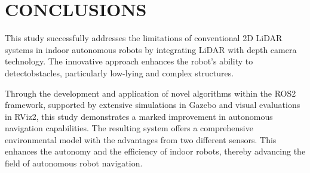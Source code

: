 \section{CONCLUSIONS}
\label{sec:conclusions}
This study successfully addresses the limitations of conventional 2D LiDAR systems in indoor autonomous robots 
by integrating LiDAR with depth camera technology. 
The innovative  approach enhances the robot's ability to detectobstacles, particularly low-lying and complex structures.

Through the development and application of novel algorithms within the ROS2 framework, 
supported by extensive simulations in Gazebo and visual evaluations in RViz2, 
this study demonstrates a marked improvement in autonomous navigation capabilities. 
The resulting system offers a comprehensive environmental model with the advantages from two different sensors. 
This enhances the autonomy and the efficiency of indoor robots, thereby advancing the field of autonomous robot navigation.
